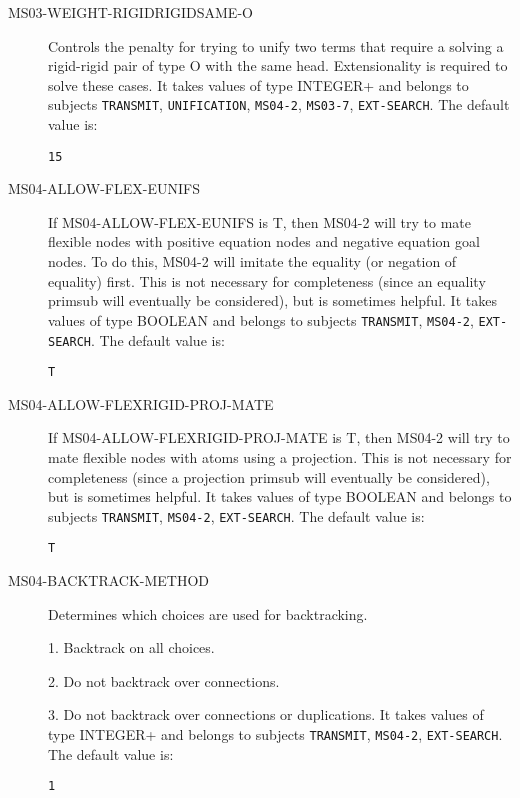 \begin{description}
\item[MS03-WEIGHT-RIGIDRIGIDSAME-O]  
Controls the penalty for trying to unify two terms that require a
solving a rigid-rigid pair of type O with the same head.
Extensionality is required to solve these cases.
It takes values of type INTEGER+ and belongs to subjects \texttt{TRANSMIT}, \texttt{UNIFICATION}, \texttt{MS04-2}, \texttt{MS03-7}, \texttt{EXT-SEARCH}.  The default value is: \begin{lstlisting}
15
\end{lstlisting}

\item[MS04-ALLOW-FLEX-EUNIFS]  
If MS04-ALLOW-FLEX-EUNIFS is T, then MS04-2 will try to mate
flexible nodes with positive equation nodes and negative equation goal nodes.
To do this, MS04-2 will imitate the equality (or negation of equality) first.
This is not necessary for completeness (since an equality primsub will eventually
be considered), but is sometimes helpful.
It takes values of type BOOLEAN and belongs to subjects \texttt{TRANSMIT}, \texttt{MS04-2}, \texttt{EXT-SEARCH}.  The default value is: \begin{lstlisting}
T
\end{lstlisting}

\item[MS04-ALLOW-FLEXRIGID-PROJ-MATE]  
If MS04-ALLOW-FLEXRIGID-PROJ-MATE is T, then MS04-2 will try to mate
flexible nodes with atoms using a projection.  This is not necessary
for completeness (since a projection primsub will eventually be
considered), but is sometimes helpful.
It takes values of type BOOLEAN and belongs to subjects \texttt{TRANSMIT}, \texttt{MS04-2}, \texttt{EXT-SEARCH}.  The default value is: \begin{lstlisting}
T
\end{lstlisting}

\item[MS04-BACKTRACK-METHOD]  
Determines which choices are used for backtracking.

1.  Backtrack on all choices.

2.  Do not backtrack over connections.

3.  Do not backtrack over connections or duplications.
It takes values of type INTEGER+ and belongs to subjects \texttt{TRANSMIT}, \texttt{MS04-2}, \texttt{EXT-SEARCH}.  The default value is: \begin{lstlisting}
1
\end{lstlisting}


\end{description}
